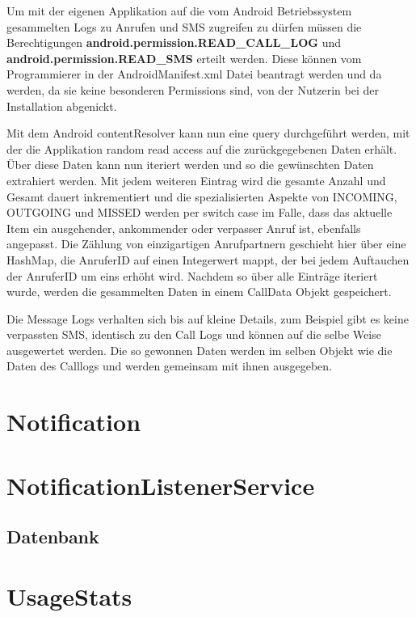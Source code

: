 Um mit der eigenen Applikation auf die vom Android Betriebssystem gesammelten Logs zu Anrufen und SMS zugreifen zu dürfen müssen die Berechtigungen 
\textbf{android.permission.READ\_CALL\_LOG} und \textbf{android.permission.READ\_SMS} erteilt werden.
Diese können vom Programmierer in der AndroidManifest.xml Datei beantragt werden und da werden, da sie keine besonderen Permissions sind,
von der Nutzerin bei der Installation abgenickt. 
\par
Mit dem Android contentResolver kann nun eine query durchgeführt werden, mit der die Applikation random read access auf die zurückgegebenen Daten erhält.
Über diese Daten kann nun iteriert werden und so die gewünschten Daten extrahiert werden.
Mit jedem weiteren Eintrag wird die gesamte Anzahl und Gesamt dauert inkrementiert und die spezialisierten Aspekte von INCOMING, OUTGOING und MISSED werden per switch case im Falle, dass das aktuelle Item ein ausgehender, ankommender oder verpasser Anruf ist, ebenfalls angepasst.
Die Zählung von einzigartigen Anrufpartnern geschieht hier über eine HashMap, die AnruferID auf einen Integerwert mappt, der bei jedem Auftauchen der AnruferID um eins erhöht wird.
Nachdem so über alle Einträge iteriert wurde, werden die gesammelten Daten in einem CallData Objekt gespeichert.
\par

Die Message Logs verhalten sich bis auf kleine Details, zum Beispiel gibt es keine verpassten SMS, identisch zu den Call Logs und können auf die selbe Weise ausgewertet werden.
Die so gewonnen Daten werden im selben Objekt wie die Daten des Calllogs und werden gemeinsam mit ihnen ausgegeben.



\section{Notification}

\section{NotificationListenerService}
\subsection{Datenbank}

\section{UsageStats}

